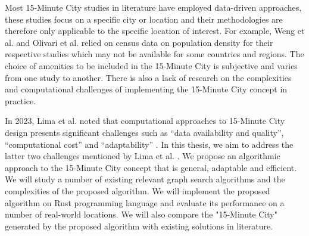 Most 15-Minute City studies in literature have employed data-driven approaches, these studies focus on a specific city or location and their methodologies are therefore only applicable to the specific location of interest. For example, Weng et al. \cite{weng_15-minute_2019} and Olivari et al.\cite{olivari_are_2023} relied on census data on population density for their respective studies which may not be available for some countries and regions. The choice of amenities to be included in the 15-Minute City is subjective and varies from one study to another. There is also a lack of research on the complexities and computational challenges of implementing the 15-Minute City concept in practice.

In 2023, Lima et al. noted that computational approaches to 15-Minute City design presents significant challenges such as “data availability and quality”, “computational cost” and “adaptability” \cite{lima_quest_2023}. In this thesis, we aim to address the latter two challenges mentioned by Lima et al. \cite{lima_quest_2023}. We propose an algorithmic approach to the 15-Minute City concept that is general, adaptable and efficient. We will study a number of existing relevant graph search algorithms and the complexities of the proposed algorithm. We will implement the proposed algorithm on Rust programming language and evaluate its performance on a number of real-world locations. We will also compare the "15-Minute City" generated by the proposed algorithm with existing solutions in literature.